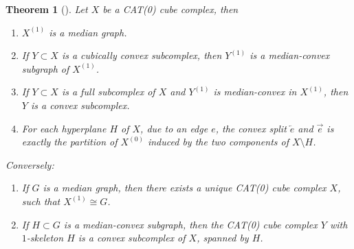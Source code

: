 \documentclass[12pt, a4paper]{article}
\theoremstyle{plain}
\newtheorem{theorem}{Theorem}[section]
\theoremstyle{definition}
\theoremstyle{remark}
\begin{document}
    \begin{theorem}[\cite{hagen}]
        Let $X$ be a CAT(0) cube complex, then
        
        \begin{enumerate}
            \item $X^{(1)}$ is a median graph.
            \item If $Y \subset X$ is a cubically convex subcomplex, then $Y^{(1)}$ is a median-convex subgraph of $X^{(1)}$.
            \item If $Y \subset X$ is a full subcomplex of $X$ and $Y^{(1)}$ is median-convex in $X^{(1)}$, then $Y$ is a convex subcomplex.
            \item For each hyperplane $H$ of $X$, due to an edge $e$, the convex split $\overleftarrow{e}$ and $\overrightarrow{e}$ is exactly the partition of $X^{(0)}$ induced by the two components of $X \setminus H$.
        \end{enumerate}
        
        Conversely:
        
        \begin{enumerate}
            \item If $G$ is a median graph, then there exists a unique CAT(0) cube complex $X$, such that $X^{(1)} \cong G$.
            \item If $H \subset G$ is a median-convex subgraph, then the CAT(0) cube complex $Y$ with $1$-skeleton $H$ is a convex subcomplex of $X$, spanned by $H$.
        \end{enumerate}
    \end{theorem}
    
    \nocite{*}
    
    
    
\end{document}
